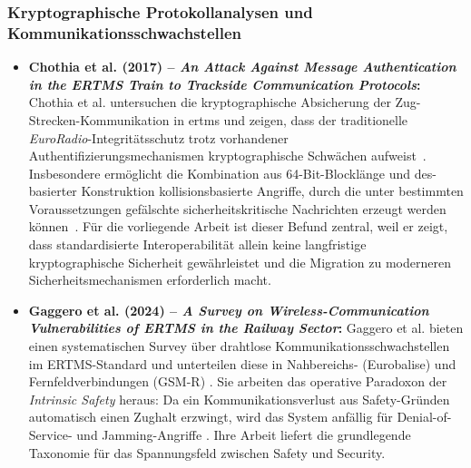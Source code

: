 \documentclass[runningheads]{res/llncs}
\begin{document}
\subsubsection{Kryptographische Protokollanalysen und Kommunikationsschwachstellen}
\begin{itemize}
    \item \textbf{Chothia et al. (2017) -- \textit{An Attack Against Message Authentication in the ERTMS Train to Trackside Communication Protocols}:}
    Chothia et al. untersuchen die kryptographische Absicherung der Zug-Strecken-Kommunikation in \gls{ertms} und zeigen, dass der traditionelle \textit{EuroRadio}-Integritätsschutz trotz vorhandener Authentifizierungsmechanismen kryptographische Schwächen aufweist~\parencite[S. 743--756]{chothiaAttack2017}. Insbesondere ermöglicht die Kombination aus 64-Bit-Blocklänge und \gls{des}-basierter Konstruktion kollisionsbasierte Angriffe, durch die unter bestimmten Voraussetzungen gefälschte sicherheitskritische Nachrichten erzeugt werden können~\parencite[S. 751--754]{chothiaAttack2017}. Für die vorliegende Arbeit ist dieser Befund zentral, weil er zeigt, dass standardisierte Interoperabilität allein keine langfristige kryptographische Sicherheit gewährleistet und die Migration zu moderneren Sicherheitsmechanismen erforderlich macht.

    \item \textbf{Gaggero et al. (2024) -- \textit{A Survey on Wireless-Communication Vulnerabilities of ERTMS in the Railway Sector}:}
    Gaggero et al. bieten einen systematischen Survey über drahtlose Kommunikationsschwachstellen im ERTMS-Standard und unterteilen diese in Nahbereichs- (Eurobalise) und Fernfeldverbindungen (GSM-R) \parencite[S. 52--61]{gaggeroSurvey2024}. Sie arbeiten das operative Paradoxon der \textit{Intrinsic Safety} heraus: Da ein Kommunikationsverlust aus Safety-Gründen automatisch einen Zughalt erzwingt, wird das System anfällig für Denial-of-Service- und Jamming-Angriffe \parencite[S. 56--59]{gaggeroSurvey2024}. Ihre Arbeit liefert die grundlegende Taxonomie für das Spannungsfeld zwischen Safety und Security.
\end{itemize}
\end{document}
